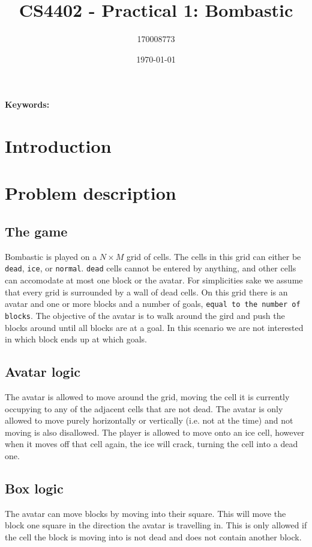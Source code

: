 \documentclass[british]{article}
\title{CS4402 - Practical 1: Bombastic}
\author{170008773}
\date{\today}
\newcommand{\code}[1]{\texttt{#1}}
\begin{document}
\maketitle


\begin{abstract}
 
\end{abstract}
{\bf Keywords:} 



\section{Introduction}
\label{intro}

 
 
\section{Problem description}
\label{problem}
\subsection{The game}
Bombastic is played on a $N\times M$ grid of cells. The cells in this grid can either be \code{dead}, \code{ice}, or \code{normal}. \code{dead} cells cannot be entered by anything, and other cells can accomodate at most one block or the avatar. For simplicities sake we assume that every grid is surrounded by a wall of dead cells. On this grid there is an avatar and one or more blocks and a number of goals, \texttt{equal to the number of blocks}. The objective of the avatar is to walk around the gird and push the blocks around until all blocks are at a goal. In this scenario we are not interested in which block ends up at which goals.  


\subsection{Avatar logic}
The avatar is allowed to move around the grid, moving the cell it is currently occupying to any of the adjacent cells that are not dead. The avatar is only allowed to move purely horizontally or vertically (i.e. not at the time) and not moving is also disallowed.  The player is allowed to move onto an ice cell, however when it moves off that cell again, the ice will crack, turning the cell into a dead one. 


\subsection{Box logic}
The avatar can move blocks by moving into their square. This will move the block one square in the direction the avatar is travelling in. This is only allowed if the cell the block is moving into is not dead and does not contain another block.
\end{document}
